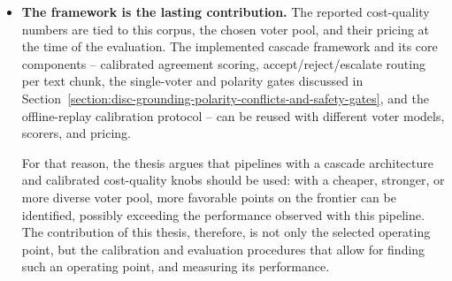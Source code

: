 \begin{itemize}[label={},leftmargin=1.5em]
    Therefore, the fair conclusion we arrive at is that, under an Opus-based silver standard, the cascade's true quality is possibly understated, and the results should not be interpreted as evidence that single-Sonnet is better than the cascade. A human-judged metric could narrow, eliminate, or even reverse the observed gap. 
    
    \item \textbf{The framework is the lasting contribution.} The reported cost-quality numbers are tied to this corpus, the chosen voter pool, and their pricing at the time of the evaluation. The implemented cascade framework and its core components -- calibrated agreement scoring, accept/reject/escalate routing per text chunk, the single-voter and polarity gates discussed in Section~\ref{section:disc-grounding-polarity-conflicts-and-safety-gates}, and the offline-replay calibration protocol -- can be reused with different voter models, scorers, and pricing. 
    
    For that reason, the thesis argues that pipelines with a cascade architecture and calibrated cost-quality knobs should be used: with a cheaper, stronger, or more diverse voter pool, more favorable points on the frontier can be identified, possibly exceeding the performance observed with this pipeline. The contribution of this thesis, therefore, is not only the selected operating point, but the calibration and evaluation procedures that allow for finding such an operating point, and measuring its performance. 

\end{itemize}